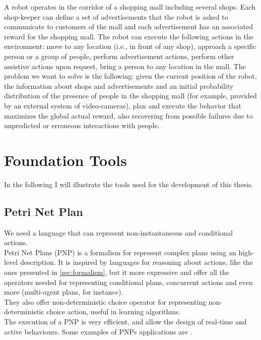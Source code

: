 \documentclass[pdftex,12pt,a4paper]{report}
\begin{document}
A robot operates in the corridor of a shopping mall including several shops. Each shop-keeper can define a set of advertisements that the robot is asked to communicate to customers of the mall and each advertisement has an associated reward for the shopping mall. The robot can execute the following actions in the environment: move to any location (i.e., in front of any shop), approach a specific person or a group of people, perform advertisement actions, perform other assistive actions upon request, bring a person to any location in the mall. The problem we want to solve is the following: given the current position of the robot, the information about shops and advertisements and an initial probability distribution of the presence of people in the shopping mall (for example, provided by an external system of video-cameras), plan and execute the behavior that maximizes the global actual reward, also recovering from possible failures due to unpredicted or erroneous interactions with people.

\chapter{Foundation Tools}
In the following I will illustrate the tools used for the development of this thesis.

\section{Petri Net Plan}\label{petrinet}
We need a language that can represent non-instantaneous and conditional actions. \\
Petri Net Plans (PNP)\cite{ziparo2006petri}%
\cite{ziparo2008pnp}%
is a formalism for represent complex plans using an high-level description.
It is inspired by languages for reasoning about actions, like the ones presented in \ref{sec:formalism}, but it more expressive and offer all the operators needed for representing conditional plans, concurrent actions and even more (multi-agent plans, for instance).\\
They also offer non-deterministic choice operator for representing non-deterministic choice action, useful in learning algorithms. \\
The execution of a PNP is very efficient, and allow the design of real-time and active behaviours.
Some examples of PNPs applications are \cite{bastianelli2013line}\cite{palamara2008robotic}\cite{farinelli2006assignment}.
\end{document}
